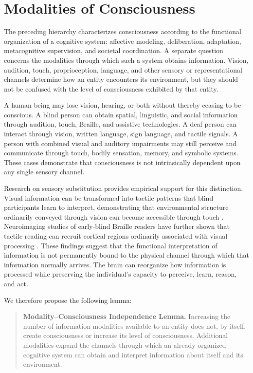 \section{Modalities of Consciousness}

The preceding hierarchy characterizes consciousness according to the functional organization of a cognitive system: affective modeling, deliberation, adaptation, metacognitive supervision, and societal coordination. A separate question concerns the modalities through which such a system obtains information. Vision, audition, touch, proprioception, language, and other sensory or representational channels determine how an entity encounters its environment, but they should not be confused with the level of consciousness exhibited by that entity.

A human being may lose vision, hearing, or both without thereby ceasing to be conscious. A blind person can obtain spatial, linguistic, and social information through audition, touch, Braille, and assistive technologies. A deaf person can interact through vision, written language, sign language, and tactile signals. A person with combined visual and auditory impairments may still perceive and communicate through touch, bodily sensation, memory, and symbolic systems. These cases demonstrate that consciousness is not intrinsically dependent upon any single sensory channel.

Research on sensory substitution provides empirical support for this distinction. Visual information can be transformed into tactile patterns that blind participants learn to interpret, demonstrating that environmental structure ordinarily conveyed through vision can become accessible through touch \cite{bachyrita1969vision}. Neuroimaging studies of early-blind Braille readers have further shown that tactile reading can recruit cortical regions ordinarily associated with visual processing \cite{sadato1996activation}. These findings suggest that the functional interpretation of information is not permanently bound to the physical channel through which that information normally arrives. The brain can reorganize how information is processed while preserving the individual's capacity to perceive, learn, reason, and act.

We therefore propose the following lemma:

\begin{quote}
\textbf{Modality--Consciousness Independence Lemma.} Increasing the number of information modalities available to an entity does not, by itself, create consciousness or increase its level of consciousness. Additional modalities expand the channels through which an already organized cognitive system can obtain and interpret information about itself and its environment.
\end{quote}


